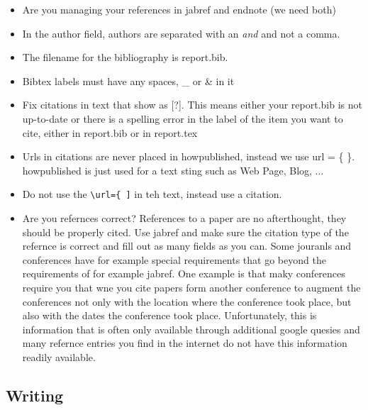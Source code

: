 \begin{itemize}[label=$\Box$]
  \item Are you managing your references in jabref and endnote (we need
    both)
  \item In the author field, authors are separated with an \textit{and}
    and not a comma.
  \item The filename for the bibliography is report.bib.
  \item Bibtex labels must have any spaces, \_ or \& in it
  \item Fix citations in text that show as [?]. This means either your
    report.bib is not up-to-date or there is a spelling error in the
    label of the item you want to cite, either in report.bib or in
    report.tex
  \item Urls in citations are never placed in howpublished, instead we
    use url = \{ \}. howpublished is just used for a text sting such
    as Web Page, Blog, ...
  \item Do not use the \verb|\url={ ]| in teh text, instead use a
      citation.
    \item Are you refernces correct? References to a paper are no
      afterthought, they should be properly cited. Use jabref and make
      sure the citation type of the refernce is correct and fill out
      as many fields as you can. Some jouranls and conferences have
      for example special requirements that go beyond the requirements
      of for example jabref. One example is that maky conferences
      require you that wne you cite papers form another conference to
      augment the conferences not only with the location where the
      conference took place, but also with the dates the conference
      took place. Unfortunately, this is information that is often
      only available through additional google quesies and many
      refernce entries you find in the internet do not have this
      information readily available.
\end{itemize}

\subsection{Writing}

